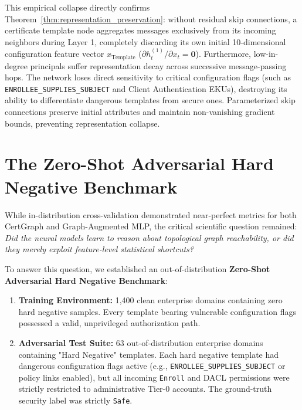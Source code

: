 This empirical collapse directly confirms Theorem~\ref{thm:representation_preservation}: without residual skip connections, a certificate template node aggregates messages exclusively from its incoming neighbors during Layer 1, completely discarding its own initial 10-dimensional configuration feature vector $x_{\text{Template}}$ ($\partial h_t^{(1)} / \partial x_t = \mathbf{0}$). Furthermore, low-in-degree principals suffer representation decay across successive message-passing hops. The network loses direct sensitivity to critical configuration flags (such as \texttt{ENROLLEE\_SUPPLIES\_SUBJECT} and Client Authentication EKUs), destroying its ability to differentiate dangerous templates from secure ones. Parameterized skip connections preserve initial attributes and maintain non-vanishing gradient bounds, preventing representation collapse.

\section{The Zero-Shot Adversarial Hard Negative Benchmark}
\label{sec:hard_negatives}
While in-distribution cross-validation demonstrated near-perfect metrics for both CertGraph and Graph-Augmented MLP, the critical scientific question remained: \textit{Did the neural models learn to reason about topological graph reachability, or did they merely exploit feature-level statistical shortcuts?}

To answer this question, we established an out-of-distribution \textbf{Zero-Shot Adversarial Hard Negative Benchmark}:
\begin{enumerate}
    \item \textbf{Training Environment:} 1,400 clean enterprise domains containing zero hard negative samples. Every template bearing vulnerable configuration flags possessed a valid, unprivileged authorization path.
    \item \textbf{Adversarial Test Suite:} 63 out-of-distribution enterprise domains containing "Hard Negative" templates. Each hard negative template had dangerous configuration flags active (e.g., \texttt{ENROLLEE\_SUPPLIES\_SUBJECT} or policy links enabled), but all incoming \texttt{Enroll} and DACL permissions were strictly restricted to administrative Tier-0 accounts. The ground-truth security label was strictly \texttt{Safe}.
\end{enumerate}

